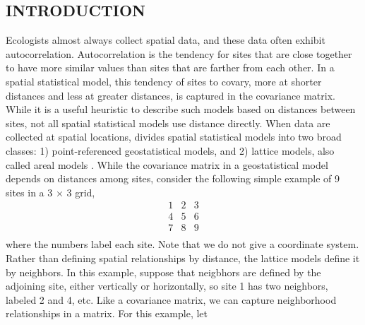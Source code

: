 \documentclass[11pt, titlepage]{article}\usepackage[]{graphicx}\usepackage[]{color}
\begin{document}

\newpage
\begin{spacing}{1.9}
\begin{flushleft}
\setlength{\parindent}{1cm}



\section*{INTRODUCTION}

Ecologists almost always collect spatial data, and these data often exhibit autocorrelation.  Autocorrelation is the tendency for sites that are close together to have more similar values than sites that are farther from each other.  In a spatial statistical model, this tendency of sites to covary, more at shorter distances and less at greater distances, is captured in the covariance matrix.  While it is a useful heuristic to describe such models based on distances between sites, not all spatial statistical models use distance directly. When data are collected at spatial locations, \citet[][p. 8]{Cres:stat:1993} divides spatial statistical models into two broad classes: 1) point-referenced geostatistical models, and 2) lattice models, also called areal models \citep{Bane:Carl:Gelf:hier:2014}.  While the covariance matrix in a geostatistical model depends on distances among sites, consider the following simple example of 9 sites in a 3 $\times$ 3 grid,
\[
	\begin{array}{ccc}
		1 & 2 & 3 \\
		4 & 5 & 6 \\
		7 & 8 & 9 \\
	\end{array}
\]
where the numbers label each site.  Note that we do not give a coordinate system.  Rather than defining spatial relationships by distance, the lattice models define it by neighbors.  In this example, suppose that neigbhors are defined by the adjoining site, either vertically or horizontally, so site 1 has two neighbors, labeled 2 and 4, etc.  Like a covariance matrix, we can capture neighborhood relationships in a matrix.  For this example, let


\end{flushleft}
\end{spacing}
\end{document}
